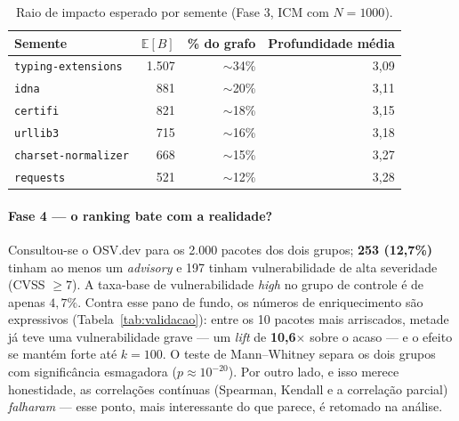 \documentclass[11pt,a4paper]{article}
\begin{document}
\begin{table}[h]
\centering\small
\caption{Raio de impacto esperado por semente (Fase 3, ICM com $N=1000$).}
\label{tab:cascata}
\begin{tabular}{lrrr}
\toprule
Semente & $\mathbb{E}[B]$ & \% do grafo & Profundidade média \\
\midrule
\texttt{typing-extensions} & 1.507 & $\sim$34\% & 3,09 \\
\texttt{idna}              &   881 & $\sim$20\% & 3,11 \\
\texttt{certifi}           &   821 & $\sim$18\% & 3,15 \\
\texttt{urllib3}           &   715 & $\sim$16\% & 3,18 \\
\texttt{charset-normalizer}&   668 & $\sim$15\% & 3,27 \\
\texttt{requests}          &   521 & $\sim$12\% & 3,28 \\
\bottomrule
\end{tabular}
\end{table}

\paragraph{Fase 4 --- o ranking bate com a realidade?}
Consultou-se o OSV.dev para os 2.000 pacotes dos dois grupos; \textbf{253 (12,7\%)}
tinham ao menos um \emph{advisory} e 197 tinham vulnerabilidade de alta severidade
(CVSS $\geq 7$). A taxa-base de vulnerabilidade \emph{high} no grupo de controle é de
apenas $4{,}7\%$. Contra esse pano de fundo, os números de enriquecimento são
expressivos (Tabela~\ref{tab:validacao}): entre os 10 pacotes mais arriscados, metade
já teve uma vulnerabilidade grave --- um \emph{lift} de \textbf{10,6$\times$} sobre o
acaso --- e o efeito se mantém forte até $k=100$. O teste de Mann--Whitney separa os
dois grupos com significância esmagadora ($p \approx 10^{-20}$). Por outro lado, e isso
merece honestidade, as correlações contínuas (Spearman, Kendall e a correlação
parcial) \emph{falharam} --- esse ponto, mais interessante do que
parece, é retomado na análise.
\end{document}
